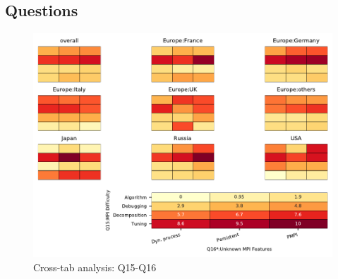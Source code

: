 
\subsection{Questions}


\begin{figure}
\begin{center}
\includegraphics[width=12cm]{../pdfs/Q15-Q16.pdf}
\caption{Cross-tab analysis: Q15-Q16}
\label{fig:Q15-Q16}
\end{center}
\end{figure}
